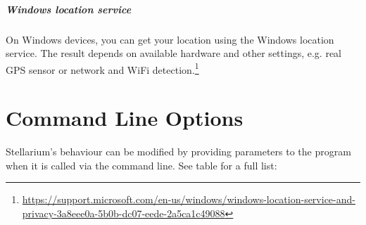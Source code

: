\paragraph{Windows location service} On Windows devices, you can get your location
using the Windows location service. The result depends on available
hardware and other settings, e.g. real GPS sensor or network and WiFi
detection.\footnote{\url{https://support.microsoft.com/en-us/windows/windows-location-service-and-privacy-3a8eee0a-5b0b-dc07-eede-2a5ca1c49088}}

\chapter{Command Line Options}
\label{sec:CommandLineOptions}

Stellarium's behaviour can be modified by providing parameters to the
program when it is called via the command line. See table for a full list:

